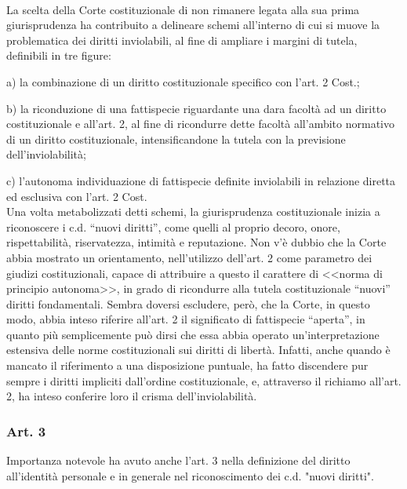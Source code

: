 \\La scelta della Corte costituzionale di non rimanere legata alla sua prima giurisprudenza ha contribuito a delineare schemi all'interno di cui si muove la problematica dei diritti inviolabili, al fine di ampliare i margini di tutela, definibili in tre figure: 

a) la combinazione di un diritto costituzionale specifico con l’art. 2 Cost.;

b) la riconduzione di una fattispecie riguardante una dara facoltà ad un diritto costituzionale e all’art. 2, al fine di ricondurre dette facoltà all’ambito normativo di un diritto costituzionale, intensificandone la tutela con la previsione dell’inviolabilità; 

c) l’autonoma individuazione di fattispecie definite inviolabili in relazione diretta ed esclusiva con l’art. 2 Cost.
\\Una volta metabolizzati detti schemi, la giurisprudenza costituzionale inizia a riconoscere i c.d. “nuovi diritti”, come quelli al proprio decoro, onore, rispettabilità, riservatezza, intimità e reputazione.
Non v’è dubbio che la Corte abbia mostrato un orientamento, nell’utilizzo dell’art. 2 come parametro dei giudizi costituzionali, capace di attribuire a questo il carattere di <<norma di principio autonoma>>, in grado di ricondurre alla tutela costituzionale “nuovi” diritti fondamentali. Sembra doversi escludere, però, che la Corte, in questo modo, abbia inteso riferire all’art. 2 il significato di fattispecie “aperta”, in quanto più semplicemente può dirsi che essa abbia operato un’interpretazione estensiva delle norme costituzionali sui diritti di libertà. Infatti, anche quando è mancato il riferimento a una disposizione puntuale, ha fatto discendere pur sempre i diritti impliciti dall’ordine costituzionale, e, attraverso il richiamo all’art. 2, ha inteso conferire loro il crisma dell’inviolabilità.


\subsubsection{Art. 3}
Importanza notevole ha avuto anche l'art. 3 nella definizione del diritto all'identità personale e in generale nel riconoscimento dei c.d. "nuovi diritti".

